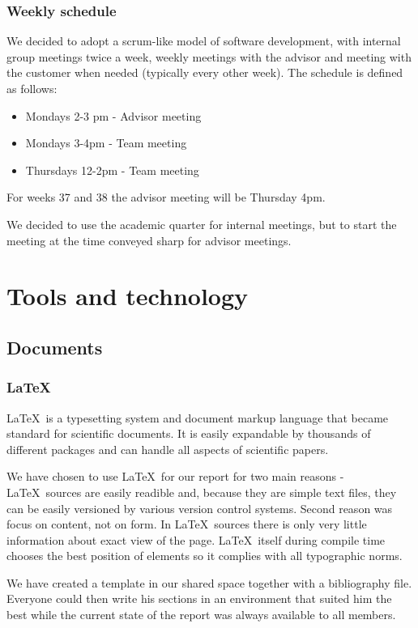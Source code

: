 \documentclass[11pt,a4paper,titlepage,oneside]{report}
\begin{document}
\subsection{Weekly schedule}
We decided to adopt a scrum-like model of software development, with internal group meetings twice a week, weekly meetings with the advisor and meeting with the customer when needed (typically every other week). The schedule is defined as follows:
\begin{itemize}
\item Mondays 2-3 pm - Advisor meeting
\item Mondays 3-4pm - Team meeting
\item Thursdays 12-2pm - Team meeting
\end{itemize}
For weeks 37 and 38 the advisor meeting will be Thursday 4pm.

We decided to use the academic quarter for internal meetings, but to start the meeting at the time conveyed sharp for advisor meetings.

\chapter{Tools and technology}
\section{Documents}

  \subsection{\LaTeX}
  \LaTeX~is a typesetting system and document markup language that became standard for scientific documents. It is easily expandable by thousands of different packages and can handle all aspects of scientific papers.

  We have chosen to use \LaTeX~for our report for two main reasons - \LaTeX~sources are easily readible and, because they are simple text files, they can be easily versioned by various version control systems. Second reason was focus on content, not on form. In \LaTeX~sources there is only very little information about exact view of the page. \LaTeX~itself during compile time chooses the best position of elements so it complies with all typographic norms.

  We have created a template in our shared space together with a bibliography file. Everyone could then write his sections in an environment that suited him the best while the current state of the report was always available to all members.
\end{document}
